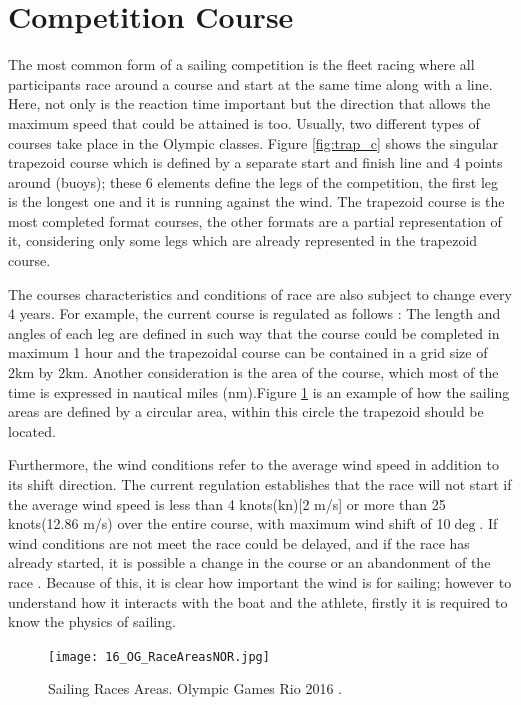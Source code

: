\section{Competition Course}\label{tracks}
The most common form of a sailing competition is the fleet racing where all participants race around a course and start at the same time along with a line. Here, not only is the reaction time important but the direction that allows the maximum speed that could be attained is too. Usually, two different types of courses take place in the Olympic classes. Figure \ref{fig:trap_c} shows the singular trapezoid course which is defined by a separate start and finish line and 4 points around (buoys); these 6 elements define the legs of the competition, the first leg is the longest one and it is running against the wind.
The trapezoid course is the most completed format courses, the other formats are a partial representation of it, considering only some legs which are already represented in the trapezoid course.\par 

The courses characteristics and conditions of race are also subject to change every 4 years. For example, the current course is regulated as follows \cite{race_pol}: The length and angles of each leg are defined in such way that the course could be completed in maximum 1 hour and the trapezoidal course can be contained in a grid size of 2km by 2km.  Another consideration is the area of the course,  which most of the time is expressed in nautical miles (nm).Figure \ref{fig:olymp_areas_rio} is an example of how the sailing areas are defined by a circular area, within this circle the trapezoid should be located. \par 
Furthermore, the wind conditions refer to the average wind speed in addition to its shift direction. The current regulation establishes that the race will not start if the average wind speed is less than 4 knots(kn)[2 m/s] or more than 25 knots(12.86 m/s) over the entire course, with maximum wind shift of 10$\deg$. 
If wind conditions are not meet the race could be delayed, and if the race has already started, it is possible a change in the course or an abandonment of the race \cite{race_pol}. Because of this, it is clear how important the wind is for sailing; however to understand how it interacts with the boat and the athlete, firstly it is required to know the physics of sailing. \par 
\begin{figure}[ht]
\centering
 \texttt{[image: 16\_OG\_RaceAreasNOR.jpg]}
  \caption{Sailing Races Areas. Olympic Games Rio 2016 \cite{instr_rio}.}
\label{fig:olymp_areas_rio} 
\end{figure}

